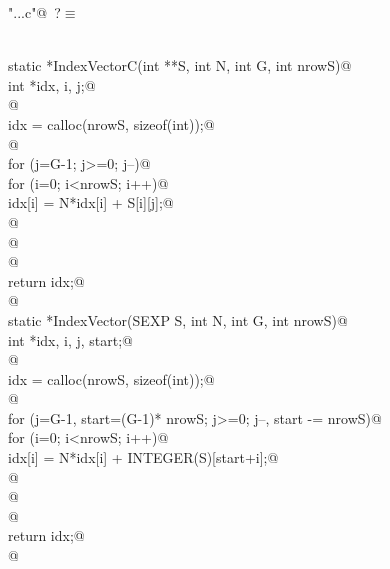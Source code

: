 \documentclass[reqno]{amsart}
\renewcommand{\NWtarget}[2]{\hypertarget{#1}{#2}}
\begin{document}
\begin{flushleft} \small\label{scrap23}\raggedright\small
\NWtarget{nuweb?}{} \verb@"..\src\ReprodCalcs.c"@\nobreak\ {\footnotesize {?}}$\equiv$
\vspace{-1ex}
\begin{list}{}{} \item
\mbox{}\verb@@\\
\mbox{}\verb@int static *IndexVectorC(int **S, int N, int G, int nrowS){@\\
\mbox{}\verb@ int *idx, i, j;@\\
\mbox{}\verb@ @\\
\mbox{}\verb@ idx = calloc(nrowS, sizeof(int));@\\
\mbox{}\verb@ @\\
\mbox{}\verb@ for (j=G-1; j>=0; j--){@\\
\mbox{}\verb@   for (i=0; i<nrowS; i++){@\\
\mbox{}\verb@           idx[i] = N*idx[i] + S[i][j];@\\
\mbox{}\verb@   }@\\
\mbox{}\verb@ }@\\
\mbox{}\verb@ @\\
\mbox{}\verb@ return idx;@\\
\mbox{}\verb@}@\\
\mbox{}\verb@int static *IndexVector(SEXP S, int N, int G, int nrowS){@\\
\mbox{}\verb@ int *idx, i, j,  start;@\\
\mbox{}\verb@ @\\
\mbox{}\verb@ idx = calloc(nrowS, sizeof(int));@\\
\mbox{}\verb@ @\\
\mbox{}\verb@ for (j=G-1, start=(G-1)* nrowS; j>=0; j--, start -= nrowS){@\\
\mbox{}\verb@   for (i=0; i<nrowS; i++){@\\
\mbox{}\verb@           idx[i] = N*idx[i] + INTEGER(S)[start+i];@\\
\mbox{}\verb@   }@\\
\mbox{}\verb@ }@\\
\mbox{}\verb@ @\\
\mbox{}\verb@ return idx;@\\
\mbox{}\verb@}@\\
\mbox{}\verb@@{\NWsep}
\end{list}
\vspace{-1.5ex}
\footnotesize
\begin{list}{}{\setlength{\itemsep}{-\parsep}\setlength{\itemindent}{-\leftmargin}}

\end{list}
\end{flushleft}
\end{document}
